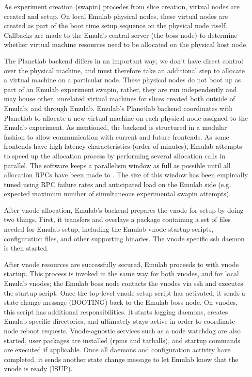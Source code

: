 As experiment creation (swapin) procedes from slice creation, virtual
nodes are created and setup.  On local Emulab physical nodes, these
virtual nodes are created as part of the boot time setup sequence on
the physical node itself.  Callbacks are made to the Emulab central
server (the boss node) to determine whether virtual machine resources
need to be allocated on the physical host node.

The Planetlab backend differs in an important way; we don't have
direct control over the physical machine, and must therefore take an
additional step to allocate a virtual machine on a particular node.
These physical nodes do not boot up as part of an Emulab experiment
swapin, rather, they are run independently and may house other,
unrelated virtual machines for slices created both outside of Emulab,
and through Emulab.  Emulab's Planetlab backend coordinates with
Planetlab to allocate a new virtual machine on each \plab physical
node assigned to the Emulab experiment.  As mentioned, the \plab
backend is structured in a modular fashion to allow communication with
current and future \plab frontends.  As some \plab frontends have high
latency characteristics (order of minutes), Emulab attempts to speed up
the allocation process by performing several allocation calls in
parallel.  The software keeps a parallelism window as full as possible
until all allocation RPCs have been made to \plab.  The size of this
window has been empircally tuned using RPC failure rates and
anticipated load on the Emulab side (e.g. expected maximum number of
simultaneous \plab experimental swapin attempts).

After \plab vnode allocation, Emulab's \plab backend prepares the
vnode for setup by doing two things.  First, it transfers and overlays
a package containing a set of files needed for Emulab setup, including
the Emulab vnode startup scripts, configuration files, and other
supporting binaries.  The vnode specific ssh daemon is then started.

After vnode resources are successfully secured, Emulab proceeds to
with vnode startup.  This process is invoked in the same way for both
\plab vnodes, and for local Emulab vnodes; the Emulab boss node
contacts the vnodes via ssh and executes the startup script.  Once the
top-level vnode setup script has activated, it sends a state change
message (BOOTING) back to the Emulab boss node.  On \plab vnodes, this
script has additional responsibilities.  It starts logging daemons,
creates Emulab-specific directories, and ultimately stays active in
order to coordinate node reboot requests.  Vnode-agnostic services
such as a node watchdog are also started, user packages are installed
(rpms and tarballs), and startup commands are executed if applicable.
Once all daemons and configuration activity have completed, it sends
another state change message to let Emulab know that the vnode is
ready (ISUP).


